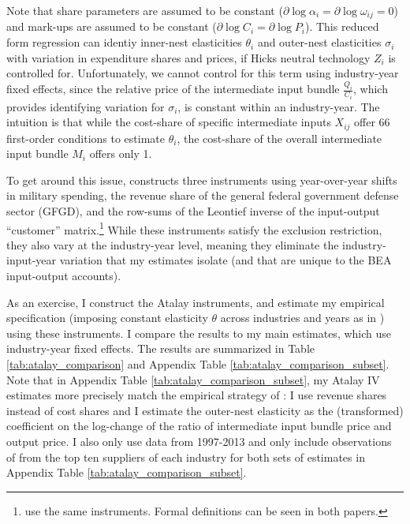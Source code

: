 \documentclass[11pt]{article}
\begin{document}
Note that share parameters are assumed to be constant ($\partial \log \alpha_i = \partial \log \omega_{ij} = 0$) and mark-ups are assumed to be constant ($\partial \log C_i = \partial \log P_i$). This reduced form regression can identiy inner-nest elasticities $\theta_i$ and outer-nest elasticities $\sigma_i$ with variation in expenditure shares and prices, if Hicks neutral technology $Z_i$ is controlled for. Unfortunately, we cannot control for this term using industry-year fixed effects, since the relative price of the intermediate input bundle $\frac{Q_i}{C_i}$, which provides identifying variation for $\sigma_i$, is constant within an industry-year. The intuition is that while the cost-share of specific intermediate inputs $X_{ij}$ offer 66 first-order conditions to estimate $\theta_i$, the cost-share of the overall intermediate input bundle $M_i$ offers only 1. 

To get around this issue, \citet{atalayHowImportantAre2017} constructs three instruments using year-over-year shifts in military spending, the revenue share of the general federal government defense sector (GFGD), and the row-sums of the Leontief inverse of the input-output ``customer'' matrix.\footnote{\citet{miranda-pintoFlexibilityFrictionsMultisector2022} use the same instruments. Formal definitions can be seen in both papers.} While these instruments satisfy the exclusion restriction, they also vary at the industry-year level, meaning they eliminate the industry-input-year variation that my estimates isolate (and that are unique to the BEA input-output accounts). 

As an exercise, I construct the Atalay instruments, and estimate my empirical specification (imposing constant elasticity $\theta$ across industries and years as in \citet{atalayHowImportantAre2017}) using these instruments. I compare the results to my main estimates, which use industry-year fixed effects. The results are summarized in Table \ref{tab:atalay_comparison} and Appendix Table \ref{tab:atalay_comparison_subset}. Note that in Appendix Table \ref{tab:atalay_comparison_subset}, my Atalay IV estimates more precisely match the empirical strategy of \citet{atalayHowImportantAre2017}: I use revenue shares instead of cost shares and I estimate the outer-nest elasticity as the (transformed) coefficient on the log-change of the ratio of intermediate input bundle price and output price. I also only use data from 1997-2013 and only include observations of from the top ten suppliers of each industry for both sets of estimates in Appendix Table \ref{tab:atalay_comparison_subset}.
\end{document}
